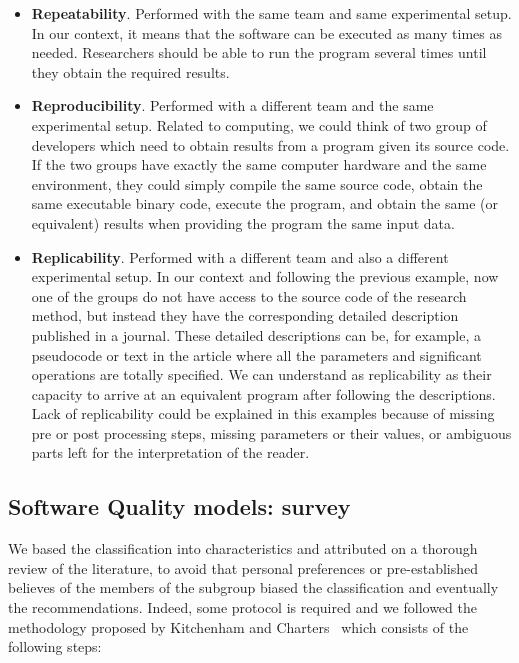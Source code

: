 \begin{itemize}
    \item \textbf{Repeatability}. Performed with the same team and same experimental setup. In our context, it means that the software can be executed as many times as needed. Researchers should be able to run the program several times until they obtain the required results.
    
    \item \textbf{Reproducibility}. Performed with a different team and the same experimental setup. Related to computing, we could think of two group of developers which need to obtain results from a program given its source code. If the two groups have exactly the same computer hardware and the same environment, they could simply compile the same source code, obtain the same executable binary code, execute the program, and obtain the same (or equivalent) results when providing the program the same input data.

    \item \textbf{Replicability}. Performed with a different team and also a different experimental setup. In our context and following the previous example, now one of the groups do not have access to the source code of the research method, but instead they have the corresponding detailed description published in a journal. These detailed descriptions can be, for example, a pseudocode or text in the article where all the parameters and significant operations are totally specified. We can understand as replicability as their capacity to arrive at an equivalent program after following the descriptions. Lack of replicability could be explained in this examples because of missing pre or post processing steps, missing parameters or their values, or ambiguous parts left for the interpretation of the reader.
\end{itemize}

\subsection{Software Quality models: survey}

We based the classification into characteristics and attributed on a thorough review of the literature, to avoid that personal preferences or pre-established believes of the members of the subgroup biased the classification and eventually the recommendations. Indeed, some protocol is required and we followed the methodology proposed by Kitchenham and Charters~\cite{keele2007guidelines} which consists of the following steps:

